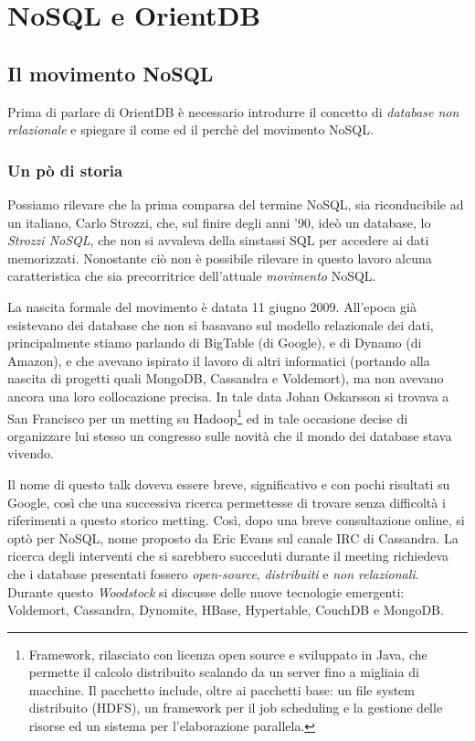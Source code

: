 \chapter{NoSQL e OrientDB}

\section{Il movimento NoSQL}
Prima di parlare di OrientDB è necessario introdurre il concetto di \emph{database non relazionale} e spiegare il come ed il perchè del movimento NoSQL.

\subsection{Un pò di storia}
Possiamo rilevare che la prima comparsa del termine NoSQL, sia riconducibile ad un italiano, Carlo Strozzi, che, sul finire degli anni '90, ideò un database, lo \emph{Strozzi NoSQL}, che non si avvaleva della sinstassi SQL per accedere ai dati memorizzati. Nonostante ciò non è possibile rilevare in questo lavoro alcuna caratteristica che sia precorritrice dell'attuale \emph{movimento} NoSQL.

La nascita formale del movimento è datata 11 giugno 2009. All'epoca già esistevano dei database che non si basavano sul modello relazionale dei dati, principalmente stiamo parlando di BigTable (di Google), e di Dynamo (di Amazon), e che avevano ispirato il lavoro di altri informatici (portando alla nascita di progetti quali MongoDB, Cassandra e Voldemort), ma non avevano ancora una loro collocazione precisa. 
In tale data Johan Oskarsson si trovava a San Francisco per un metting su 
Hadoop\footnote{Framework, rilasciato con licenza open source e sviluppato in Java, che permette il calcolo distribuito scalando da un server fino a migliaia di macchine. Il pacchetto include, oltre ai pacchetti base: un file system distribuito (HDFS), un framework per il job scheduling e la gestione delle risorse ed un sistema per l'elaborazione parallela.} 
ed in tale occasione decise di organizzare lui stesso un congresso sulle novità che il mondo dei database stava vivendo.

Il nome di questo talk doveva essere breve, significativo e con pochi risultati su Google, così che una successiva ricerca permettesse di trovare senza difficoltà i riferimenti a questo storico metting. Così, dopo una breve consultazione online, si optò per NoSQL, nome proposto da Eric Evans sul canale IRC di Cassandra. La ricerca degli interventi che si sarebbero succeduti durante il meeting richiedeva che i database presentati fossero \emph{open-source}, \emph{distribuiti} e \emph{non relazionali}. Durante questo \emph{Woodstock} si discusse delle nuove tecnologie emergenti: Voldemort, Cassandra, Dynomite, HBase, Hypertable, CouchDB e MongoDB.  

